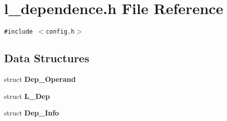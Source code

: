 \section{l\_\-dependence.h File Reference}
\label{l__dependence_8h}
{\tt \#include $<$config.h$>$}\par
\subsection*{Data Structures}
\begin{CompactItemize}
\item 
struct \bf{Dep\_\-Operand}
\item 
struct \bf{L\_\-Dep}
\item 
struct \bf{Dep\_\-Info}
\end{CompactItemize}
